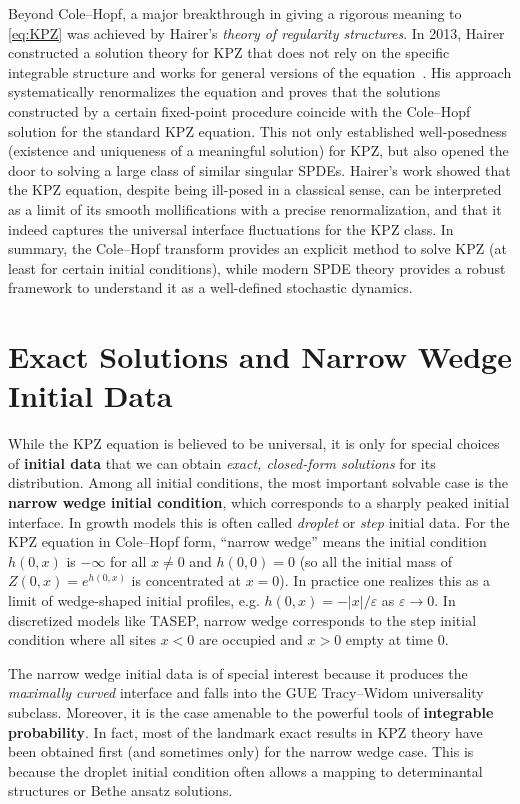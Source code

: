 \documentclass[letterpaper,11pt,oneside,reqno]{article}
\numberwithin{equation}{section}
\theoremstyle{definition}
\begin{document}
Beyond Cole–Hopf, a major breakthrough in giving a rigorous meaning to \eqref{eq:KPZ} was achieved by Hairer’s \emph{theory of regularity structures}. In 2013, Hairer constructed a solution theory for KPZ that does not rely on the specific integrable structure and works for general versions of the equation \cite{Hairer2013}. His approach systematically renormalizes the equation and proves that the solutions constructed by a certain fixed-point procedure coincide with the Cole–Hopf solution for the standard KPZ equation. This not only established well-posedness (existence and uniqueness of a meaningful solution) for KPZ, but also opened the door to solving a large class of similar singular SPDEs. Hairer’s work showed that the KPZ equation, despite being ill-posed in a classical sense, can be interpreted as a limit of its smooth mollifications with a precise renormalization, and that it indeed captures the universal interface fluctuations for the KPZ class. In summary, the Cole–Hopf transform provides an explicit method to solve KPZ (at least for certain initial conditions), while modern SPDE theory provides a robust framework to understand it as a well-defined stochastic dynamics.

\section{Exact Solutions and Narrow Wedge Initial Data}
While the KPZ equation is believed to be universal, it is only for special choices of \textbf{initial data} that we can obtain \emph{exact, closed-form solutions} for its distribution. Among all initial conditions, the most important solvable case is the \textbf{narrow wedge initial condition}, which corresponds to a sharply peaked initial interface. In growth models this is often called \emph{droplet} or \emph{step} initial data. For the KPZ equation in Cole–Hopf form, “narrow wedge” means the initial condition $h(0,x)$ is $-\infty$ for all $x\neq 0$ and $h(0,0)=0$ (so all the initial mass of $Z(0,x)=e^{h(0,x)}$ is concentrated at $x=0$). In practice one realizes this as a limit of wedge-shaped initial profiles, e.g. $h(0,x) = -|x|/\varepsilon$ as $\varepsilon\to0$. In discretized models like TASEP, narrow wedge corresponds to the step initial condition where all sites $x<0$ are occupied and $x>0$ empty at time $0$.

The narrow wedge initial data is of special interest because it produces the \emph{maximally curved} interface and falls into the GUE Tracy–Widom universality subclass. Moreover, it is the case amenable to the powerful tools of \textbf{integrable probability}. In fact, most of the landmark exact results in KPZ theory have been obtained first (and sometimes only) for the narrow wedge case. This is because the droplet initial condition often allows a mapping to determinantal structures or Bethe ansatz solutions.
\end{document}

